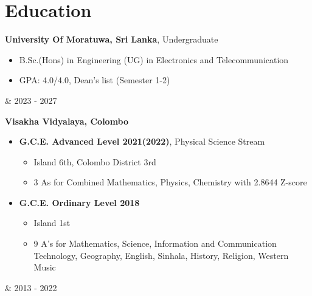 \documentclass[10pt, a4paper]{article}
\newenvironment{highlights}{
        \begin{itemize}[
                topsep=0pt,
                parsep=0.10 cm,
                partopsep=0pt,
                itemsep=0pt,
                after=\vspace{-1\baselineskip},
                leftmargin=0.4 cm + 3pt
            ]
    }{
        \end{itemize}
    } %
\let\hrefWithoutArrow\href
\renewcommand{\href}[2]{\hrefWithoutArrow{#1}{\mbox{\ifthenelse{\equal{#2}{}}{ }{#2 }\raisebox{.15ex}{\footnotesize \faExternalLink*}}}}
\let\originalTabularx\tabularx
\let\originalEndTabularx\endtabularx
\renewenvironment{tabularx}{\bgroup\centering\originalTabularx}{\originalEndTabularx\par\egroup}
\begin{document}
    \section{Education}

	 \begin{tabularx}{
	            \textwidth-0.4 cm-0.13cm
	        }{
	            K{0.2 cm}
	            R{4.1 cm}
	        }
	            \textbf{University Of Moratuwa, Sri Lanka}, Undergraduate
	
	            \vspace{0.10 cm}
	
	            \begin{highlights}
	                \item B.Sc.(Hons) in Engineering (UG) in Electronics and Telecommunication
                \item GPA: 4.0/4.0, Dean's list (Semester 1-2)%
	            \end{highlights}
            &
            2023 - 2027
        \end{tabularx}
        
        \vspace{0.2 cm}
        \begin{tabularx}{
	            \textwidth-0.4 cm-0.13cm
	        }{
	            K{0.2 cm}
	            R{4.1 cm}
	        }
	            \textbf{Visakha Vidyalaya, Colombo}
	
	            \vspace{0.10 cm}
	
	            \begin{highlights}
	                \item \textbf{G.C.E. Advanced Level 2021(2022)}, Physical Science Stream 
	            	\begin{highlights}
	            	\item Island 6th, Colombo District 3rd 
	            	\item 3 As for Combined Mathematics, Physics, Chemistry with 2.8644 Z-score
	                \end{highlights} \vspace{0.40 cm}
	                \item \textbf{G.C.E. Ordinary Level 2018}
	                \begin{highlights}
	                \item Island 1st 
	                \item 9 A’s for Mathematics, Science, Information and Communication Technology, Geography, English, Sinhala, History, Religion, Western Music
	                \end{highlights}
	            \end{highlights}
            &
            2013 - 2022
        \end{tabularx}
\end{document}
